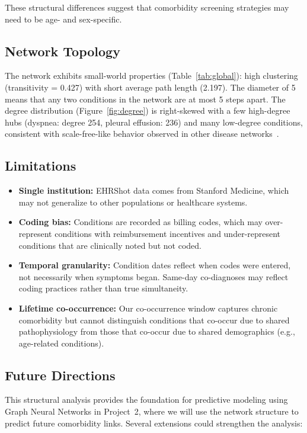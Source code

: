 \documentclass[10pt,twocolumn]{article}
\begin{document}
These structural differences suggest that comorbidity screening strategies may need to be age- and sex-specific.

\subsection{Network Topology}

The network exhibits small-world properties (Table~\ref{tab:global}): high clustering (transitivity = 0.427) with short average path length (2.197).
The diameter of 5 means that any two conditions in the network are at most 5 steps apart.
The degree distribution (Figure~\ref{fig:degree}) is right-skewed with a few high-degree hubs (dyspnea: degree 254, pleural effusion: 236) and many low-degree conditions, consistent with scale-free-like behavior observed in other disease networks~\cite{hidalgo2009}.

\subsection{Limitations}

\begin{itemize}
    \item \textbf{Single institution:} EHRShot data comes from Stanford Medicine, which may not generalize to other populations or healthcare systems.
    \item \textbf{Coding bias:} Conditions are recorded as billing codes, which may over-represent conditions with reimbursement incentives and under-represent conditions that are clinically noted but not coded.
    \item \textbf{Temporal granularity:} Condition dates reflect when codes were entered, not necessarily when symptoms began. Same-day co-diagnoses may reflect coding practices rather than true simultaneity.
    \item \textbf{Lifetime co-occurrence:} Our co-occurrence window captures chronic comorbidity but cannot distinguish conditions that co-occur due to shared pathophysiology from those that co-occur due to shared demographics (e.g., age-related conditions).
\end{itemize}

\subsection{Future Directions}

This structural analysis provides the foundation for predictive modeling using Graph Neural Networks in Project~2, where we will use the network structure to predict future comorbidity links.
Several extensions could strengthen the analysis:
\end{document}
